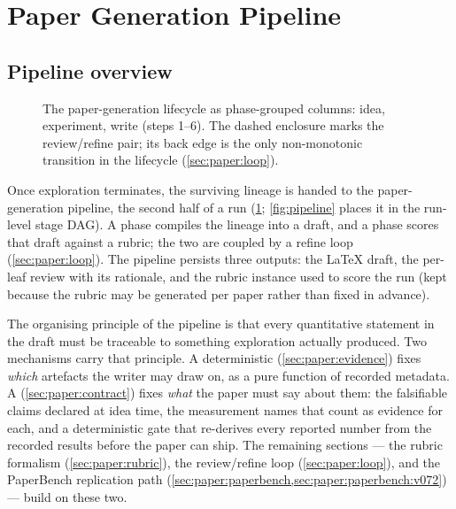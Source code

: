\section{Paper Generation Pipeline}\label{sec:paper}

\subsection{Pipeline overview}\label{sec:paper:overview}

\begin{figure}[t]
  \centering
  \resizebox{\columnwidth}{!}{}
  \caption{The paper-generation lifecycle as phase-grouped columns:
           idea, experiment, write (steps 1--6). The dashed enclosure
           marks the review/refine pair; its back edge is the only
           non-monotonic transition in the lifecycle
           (\cref{sec:paper:loop}).}
  \label{fig:swim}
\end{figure}

Once exploration terminates, the surviving lineage is handed to the
paper-generation pipeline, the second half of a run (\cref{fig:swim};
\cref{fig:pipeline} places it in the run-level stage DAG). A
 phase compiles the lineage into a draft, and a
 phase scores that draft against a rubric; the two are
coupled by a refine loop (\cref{sec:paper:loop}). The pipeline
persists three outputs: the \LaTeX{} draft, the per-leaf review with
its rationale, and the rubric instance used to score the run (kept
because the rubric may be generated per paper rather than fixed in
advance).

The organising principle of the pipeline is that every quantitative
statement in the draft must be traceable to something exploration
actually produced. Two mechanisms carry that principle. A
deterministic  (\cref{sec:paper:evidence})
fixes \emph{which} artefacts the writer may draw on, as a pure
function of recorded metadata. A 
(\cref{sec:paper:contract}) fixes \emph{what} the paper must say
about them: the falsifiable claims declared at idea time, the
measurement names that count as evidence for each, and a
deterministic gate that re-derives every reported number from the
recorded results before the paper can ship. The remaining sections
--- the rubric formalism (\cref{sec:paper:rubric}), the review/refine
loop (\cref{sec:paper:loop}), and the PaperBench replication path
(\cref{sec:paper:paperbench,sec:paper:paperbench:v072}) --- build on
these two.

